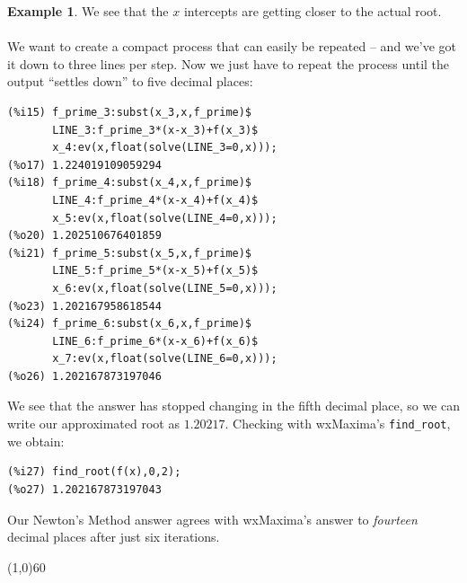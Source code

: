 \documentclass[10.5pt,twoside]{report}
\theoremstyle{definition}
\newtheorem{exmp}{Example}[section]
\begin{document}
\begin{exmp}
We see that the $x$ intercepts are getting closer to the actual root.\\
${}$\\

We want to create a compact process that can easily be repeated -- and we've got it down to three lines per step.  Now we just have to repeat the process until the output ``settles down'' to five decimal places:

\begin{verbatim}
(%i15) f_prime_3:subst(x_3,x,f_prime)$
       LINE_3:f_prime_3*(x-x_3)+f(x_3)$
       x_4:ev(x,float(solve(LINE_3=0,x)));
(%o17) 1.224019109059294
(%i18) f_prime_4:subst(x_4,x,f_prime)$
       LINE_4:f_prime_4*(x-x_4)+f(x_4)$
       x_5:ev(x,float(solve(LINE_4=0,x)));
(%o20) 1.202510676401859
(%i21) f_prime_5:subst(x_5,x,f_prime)$
       LINE_5:f_prime_5*(x-x_5)+f(x_5)$
       x_6:ev(x,float(solve(LINE_5=0,x)));
(%o23) 1.202167958618544
(%i24) f_prime_6:subst(x_6,x,f_prime)$
       LINE_6:f_prime_6*(x-x_6)+f(x_6)$
       x_7:ev(x,float(solve(LINE_6=0,x)));
(%o26) 1.202167873197046
\end{verbatim}

We see that the answer has stopped changing in the fifth decimal place, so we can write our approximated root as $1.20217$.  Checking with wxMaxima's \verb|find_root|, we obtain:

\begin{verbatim}
(%i27) find_root(f(x),0,2);
(%o27) 1.202167873197043
\end{verbatim}

Our Newton's Method answer agrees with wxMaxima's answer to \textit{fourteen} decimal places after just six iterations.


\end{exmp}

\line(1,0){60}
\linethickness{0.5mm}
\end{document}
